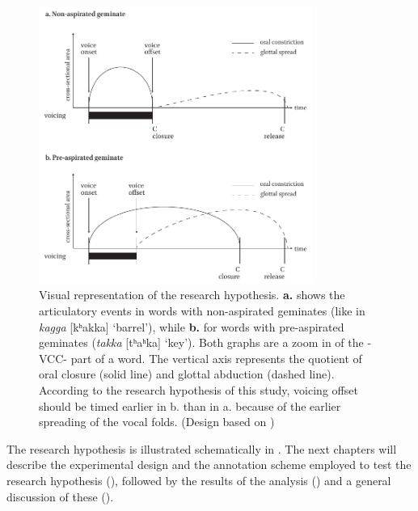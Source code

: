 \documentclass[11pt,a4paper,oneside,openany]{memoir}\usepackage[]{graphicx}\usepackage[]{color}
\begin{document}
\begin{figure}
\centering
\includegraphics[width=0.8\textwidth]{hypothesis}
\caption[Visual representation of the research hypothesis.]{Visual representation of the research hypothesis.
\textbf{a.} shows the articulatory events in words with non-aspirated geminates (like in \textit{kagga} [kʰakka] `barrel'), while \textbf{b.} for words with pre-aspirated geminates (\textit{takka} [tʰaʰka] `key').
Both graphs are a zoom in of the -VCC- part of a word.
The vertical axis represents the quotient of oral closure (solid line) and glottal abduction (dashed line).
According to the research hypothesis of this study, voicing offset should be timed earlier in b. than in a. because of the earlier spreading of the vocal folds.
(Design based on \citealt{esposito2002})}
\label{f:hypothesis}
\end{figure}


The research hypothesis is illustrated schematically in .
The next chapters will describe the experimental design and the annotation scheme employed to test the research hypothesis (), followed by the results of the analysis () and a general discussion of these ().
\end{document}
